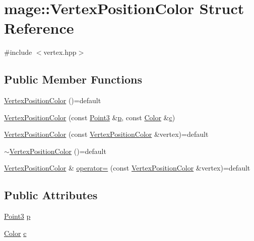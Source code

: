 \hypertarget{structmage_1_1_vertex_position_color}{}\section{mage\+:\+:Vertex\+Position\+Color Struct Reference}
\label{structmage_1_1_vertex_position_color}


{\ttfamily \#include $<$vertex.\+hpp$>$}

\subsection*{Public Member Functions}
\begin{DoxyCompactItemize}
\item 
\hyperlink{structmage_1_1_vertex_position_color_a9346fd83bc634a105b3d81231c42136b}{Vertex\+Position\+Color} ()=default
\item 
\hyperlink{structmage_1_1_vertex_position_color_aa41e2d55816bf687261f91f8e79846f2}{Vertex\+Position\+Color} (const \hyperlink{structmage_1_1_point3}{Point3} \&\hyperlink{structmage_1_1_vertex_position_color_afe40a78afb8e13e742d93d5092b1a614}{p}, const \hyperlink{structmage_1_1_color}{Color} \&\hyperlink{structmage_1_1_vertex_position_color_a4a9e50e66f73e93a9a529c0c940e2458}{c})
\item 
\hyperlink{structmage_1_1_vertex_position_color_a35fcbd35fe6384affee2b5dfabd29016}{Vertex\+Position\+Color} (const \hyperlink{structmage_1_1_vertex_position_color}{Vertex\+Position\+Color} \&vertex)=default
\item 
\hyperlink{structmage_1_1_vertex_position_color_a18c4400389dfd47482a7d0901d904aec}{$\sim$\+Vertex\+Position\+Color} ()=default
\item 
\hyperlink{structmage_1_1_vertex_position_color}{Vertex\+Position\+Color} \& \hyperlink{structmage_1_1_vertex_position_color_aa621ed54ab2eee82d636a5805db5d28b}{operator=} (const \hyperlink{structmage_1_1_vertex_position_color}{Vertex\+Position\+Color} \&vertex)=default
\end{DoxyCompactItemize}
\subsection*{Public Attributes}
\begin{DoxyCompactItemize}
\item 
\hyperlink{structmage_1_1_point3}{Point3} \hyperlink{structmage_1_1_vertex_position_color_afe40a78afb8e13e742d93d5092b1a614}{p}
\item 
\hyperlink{structmage_1_1_color}{Color} \hyperlink{structmage_1_1_vertex_position_color_a4a9e50e66f73e93a9a529c0c940e2458}{c}
\end{DoxyCompactItemize}
